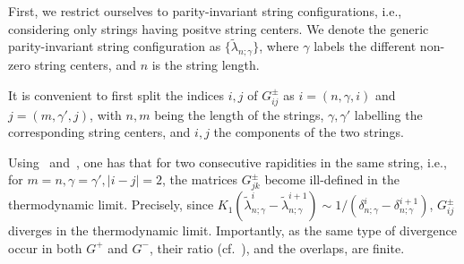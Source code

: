 \documentclass[11pt]{iopart}
\begin{document}
First, we restrict ourselves to parity-invariant string configurations, 
i.e., considering only strings having positve string centers. We denote the 
generic parity-invariant string configuration as $\{\tilde\lambda_{n;
\gamma}\}$, where $\gamma$ labels the different non-zero string centers, and 
$n$ is the string length. 

It is convenient to first split the indices $i,j$ of $G^\pm_{ij}$ as $i=(n,\gamma,i)$ 
and $j=(m,\gamma',j)$, with $n,m$ being the length of the strings, $\gamma,\gamma'$ 
labelling the corresponding string centers, and $i,j$ the components of the 
two strings. 

Using~ and~, one has that for two consecutive rapidities in the same 
string, i.e., for $m=n,\gamma=\gamma',|i-j|=2$, the matrices $G^{\pm}_{jk}$ become 
ill-defined in the thermodynamic limit. Precisely, since $K_{1}(\tilde\lambda_{n;\gamma}^i-
\tilde\lambda_{n;\gamma}^{i+1})\sim 1/(\delta_{n;\gamma}^i-\delta_{n;\gamma}^{i+1})$, 
$G_{ij}^\pm$ diverges in the thermodynamic limit. Importantly, as the same type of 
divergence occur in both $G^+$ and $G^-$, their ratio (cf.~), and 
the overlaps, are finite. 
\end{document}
